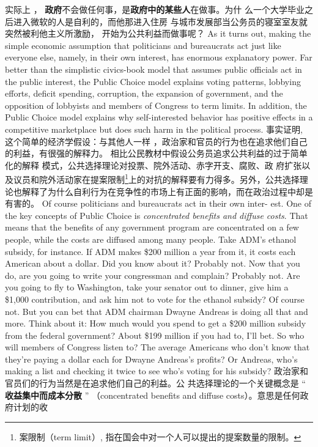 \begin{paracol}{2}
实际上 ， \textbf{政府}不会做任何事，是\textbf{政府中的某些人}在做事。为什
么一个大学毕业之后进入微软的人是自利的，而他那进入住房
与城市发展部当公务员的寝室室友就突然被利他主义所激励，
开始为公共利益而做事呢？
\switchcolumn*
As it turns out, making the simple economic assumption
that politicians and bureaucrats act just like everyone else,
namely, in their own interest, has enormous explanatory power. Far better than the simplistic civics-book model that assumes
public officials act in the public interest, the Public Choice
model explains voting patterns, lobbying efforts, deficit spending, corruption, the expansion of government, and the opposition of lobbyists and members of Congress to term limits. In
addition, the Public Choice model explains why self-interested
behavior has positive effects in a competitive marketplace but
does such harm in the political process.
\switchcolumn
事实证明, 这个简单的经济学假设：与其他人一样 ，政治家和官员的行为也在追求他们自己的利益，有很强的解释力。
相比公民教材中假设公务员追求公共利益的过于简单化的解释
模式，公共选择理论对投票、院外活动、赤字开支、腐败、政
府扩张以及议员和院外活动家在提案限制\footnote{案限制（term limit）, 指在国会中对一个人可以提出的提案数量的限制。}上的对抗的解释要有力得多。另外，公共选择理论也解释了为什么自利行为在竞争性的市场上有正面的影响，而在政治过程中却是有害的。
\switchcolumn*
Of course politicians and bureaucrats act in their own inter-
est. One of the key concepts of Public Choice is \textit{concentrated benefits and diffuse costs}. That means that the benefits of any
government program are concentrated on a few people, while
the costs are diffused among many people. Take ADM's
ethanol subsidy, for instance. If ADM makes \$200 million a
year from it, it costs each American about a dollar. Did you
know about it? Probably not. Now that you do, are you going
to write your congressman and complain? Probably not. Are
you going to fly to Washington, take your senator out to dinner, give him a \$1,000 contribution, and ask him not to vote
for the ethanol subsidy? Of course not. But you can bet that
ADM chairman Dwayne Andreas is doing all that and more.
Think about it: How much would you spend to get a \$200
million subsidy from the federal government? About \$199
million if you had to, I'll bet. So who will members of Congress
listen to? The average Americans who don't know that they're
paying a dollar each for Dwayne Andreas's profits? Or Andreas, who's making a list and checking it twice to see who's
voting for his subsidy?
\switchcolumn
政治家和官员们的行为当然是在追求他们自己的利益。公
共选择理论的一个关键概念是 “\textbf{ 收益集中而成本分散} ” （con­centrated benefits and diffuse costs）。意思是任何政府计划的收

\end{paracol}
